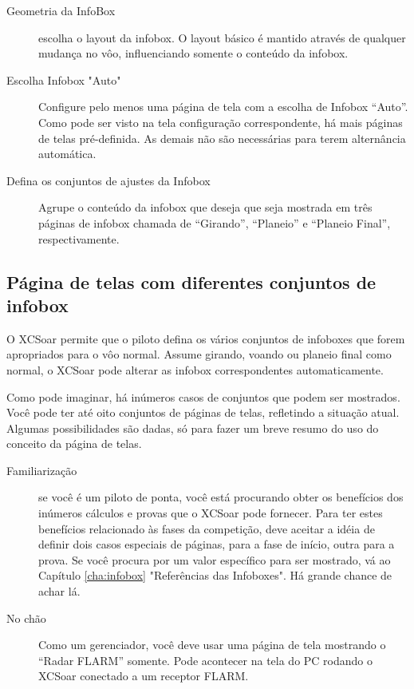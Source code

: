 \begin{description}
\item[Geometria da InfoBox] escolha o layout da infobox.  O layout básico é mantido através de qualquer mudança no vôo, influenciando somente o conteúdo da infobox.
\item[Escolha Infobox "Auto"] Configure pelo menos uma página de tela com a escolha de Infobox “Auto”.  Como pode ser visto na tela configuração correspondente, há mais páginas de telas pré-definida.  As demais não são necessárias para terem alternância automática. 
\item[Defina os conjuntos de ajustes da Infobox] Agrupe o conteúdo da infobox que deseja que seja mostrada em três páginas de infobox chamada de “Girando”, “Planeio” e “Planeio Final”, respectivamente.
\end{description}
 

 
\subsection*{Página de telas com diferentes conjuntos de infobox}\label{sec:screenpages}

O XCSoar permite que o piloto defina os vários conjuntos de infoboxes que forem apropriados para o vôo normal.  Assume girando, voando ou planeio final como normal, o XCSoar pode alterar as infobox correspondentes automaticamente.

Como pode imaginar, há inúmeros casos de conjuntos que podem ser mostrados.  Você pode ter até oito conjuntos de páginas de telas, refletindo a situação atual.  Algumas possibilidades são dadas, só para fazer um breve resumo do uso do conceito da página de telas.

\label{par:use_case}
\begin{description}
\item[Familiarização] se você é um piloto de ponta, você está procurando obter os benefícios dos inúmeros cálculos e provas que o XCSoar pode fornecer.  Para ter estes benefícios relacionado às fases da competição, deve aceitar a idéia de definir dois casos especiais de páginas, para a fase de início, outra para a prova.  Se você procura por um valor específico para ser mostrado, vá ao Capítulo  \ref{cha:infobox} "Referências das Infoboxes". 
Há grande chance de achar lá.
\item[No chão] Como um gerenciador, você deve usar uma página de tela mostrando o “Radar FLARM” somente.  Pode acontecer na tela do PC rodando o XCSoar conectado a um receptor FLARM.
\end{description}

